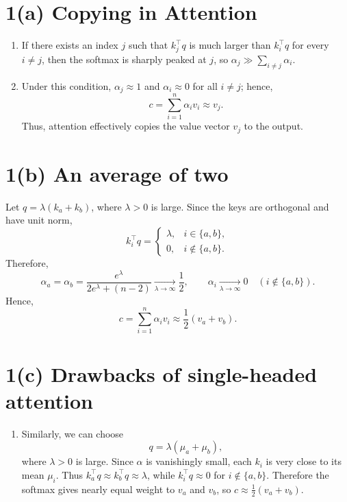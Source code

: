 \begin{answer}
\section*{1(a) Copying in Attention}

\begin{enumerate}
    \item If there exists an index $j$ such that $k_j^\top q$ is much larger than $k_i^\top q$ for every $i \ne j$, then the softmax is sharply peaked at $j$, so $\alpha_j \gg \sum_{i \ne j} \alpha_i$.

    \item Under this condition, $\alpha_j \approx 1$ and $\alpha_i \approx 0$ for all $i \ne j$; hence,
    \[
        c = \sum_{i=1}^{n} \alpha_i v_i \approx v_j.
    \]
    Thus, attention effectively copies the value vector $v_j$ to the output.
\end{enumerate}

\section*{1(b) An average of two}
Let $q = \lambda(k_a + k_b)$, where $\lambda > 0$ is large. Since the keys are orthogonal and have unit norm,
\[
    k_i^\top q =
    \begin{cases}
        \lambda, & i \in \{a,b\}, \\
        0, & i \notin \{a,b\}.
    \end{cases}
\]
Therefore,
\[
    \alpha_a = \alpha_b
    = \frac{e^\lambda}{2e^\lambda + (n-2)}
    \xrightarrow[\lambda \to \infty]{} \frac{1}{2},
    \qquad
    \alpha_i \xrightarrow[\lambda \to \infty]{} 0 \quad (i \notin \{a,b\}).
\]
Hence,
\[
    c = \sum_{i=1}^{n} \alpha_i v_i
    \approx \frac{1}{2}(v_a + v_b).
\]
\section*{1(c) Drawbacks of single-headed attention}
\begin{enumerate}
    \item Similarly, we can choose
    \[
        q = \lambda(\mu_a + \mu_b),
    \]
    where $\lambda > 0$ is large. Since $\alpha$ is vanishingly small, each $k_i$ is very close to its mean $\mu_i$. Thus $k_a^\top q \approx k_b^\top q \approx \lambda$, while $k_i^\top q \approx 0$ for $i \notin \{a,b\}$. Therefore the softmax gives nearly equal weight to $v_a$ and $v_b$, so $c \approx \frac{1}{2}(v_a + v_b)$.


\end{enumerate}
\end{answer}
